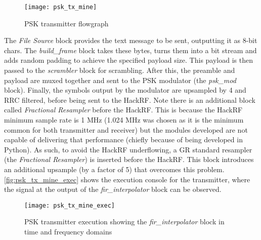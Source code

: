 \begin{sidewaysfigure}[ht]
  \centering
  \texttt{[image: psk\_tx\_mine]}
  \caption{PSK transmitter flowgraph}
  \label{fig:psk_tx_mine}
\end{sidewaysfigure}
\FloatBarrier
The \emph{File Source} block provides the text message to be sent, outputting it as 8-bit chars. The \emph{build\_frame} block takes these bytes, turns them into a bit stream and adds random padding to achieve the specified payload size. This payload is then passed to the \emph{scrambler} block for scrambling. After this, the preamble and payload are muxed together and sent to the PSK modulator (the \emph{psk\_mod} block). Finally, the symbols output by the modulator are upsampled by 4 and RRC filtered, before being sent to the HackRF. Note there is an additional block called \emph{Fractional Resampler} before the HackRF. This is because the HackRF minimum sample rate is 1 MHz (1.024 MHz was chosen as it is the minimum common for both transmitter and receiver) but the  modules developed are not capable of delivering that performance (chiefly because of being developed in Python). As such, to avoid the HackRF underflowing, a GR standard resampler (the \emph{Fractional Resampler}) is inserted before the HackRF. This block introduces an additional upsample (by a factor of 5) that overcomes this problem. \autoref{fig:psk_tx_mine_exec} shows the execution console for the transmitter, where the signal at the output of the \emph{fir\_interpolator} block can be observed.

\begin{figure}[H]
  \centering
  \texttt{[image: psk\_tx\_mine\_exec]}
  \caption{PSK transmitter execution showing the \emph{fir\_interpolator} block in time and frequency domains}
  \label{fig:psk_tx_mine_exec}
\end{figure}

